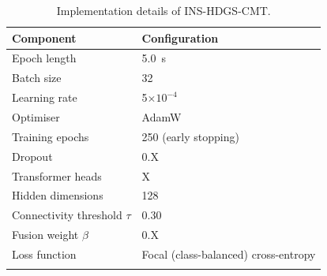\begin{table}[t]
  \caption{Implementation details of INS-HDGS-CMT.}
  \label{tab:impl}
  \centering
  \begin{tabular}{@{}ll@{}}
    \toprule
    Component & Configuration \\
    \midrule
    Epoch length & 5.0~s \\
    Batch size & 32 \\
    Learning rate & 5$\times10^{-4}$ \\
    Optimiser & AdamW \\
    Training epochs & 250 (early stopping) \\
    Dropout & 0.X \\
    Transformer heads & X \\
    Hidden dimensions & 128 \\
    Connectivity threshold $\tau$ & 0.30 \\
    Fusion weight $\beta$ & 0.X \\
    Loss function & Focal (class-balanced) cross-entropy \\
    \botrule
  \end{tabular}
\end{table}
